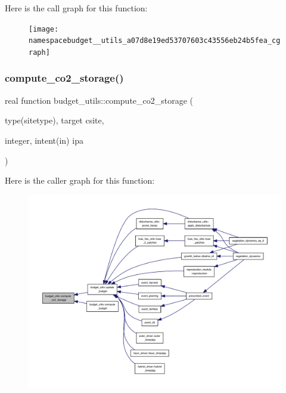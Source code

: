 Here is the call graph for this function\+:
\nopagebreak
\begin{figure}[H]
\begin{center}
\leavevmode
\texttt{[image: namespacebudget\_\_utils\_a07d8e19ed53707603c43556eb24b5fea\_cgraph]}
\end{center}
\end{figure}
\mbox{\label{namespacebudget__utils_aa1c4f8466010b1673f2914f1bfe9b6ee}} 
\subsubsection{\texorpdfstring{compute\+\_\+co2\+\_\+storage()}{compute\_co2\_storage()}}
{\footnotesize\ttfamily real function budget\+\_\+utils\+::compute\+\_\+co2\+\_\+storage (\begin{DoxyParamCaption}\item[{type(sitetype), target}]{csite,  }\item[{integer, intent(in)}]{ipa }\end{DoxyParamCaption})}

Here is the caller graph for this function\+:
\nopagebreak
\begin{figure}[H]
\begin{center}
\leavevmode
\includegraphics[width=350pt]{namespacebudget__utils_aa1c4f8466010b1673f2914f1bfe9b6ee_icgraph}
\end{center}
\end{figure}
\mbox{\label{namespacebudget__utils_a319c5f7252c344bcebbd162593e25ec8}} 

